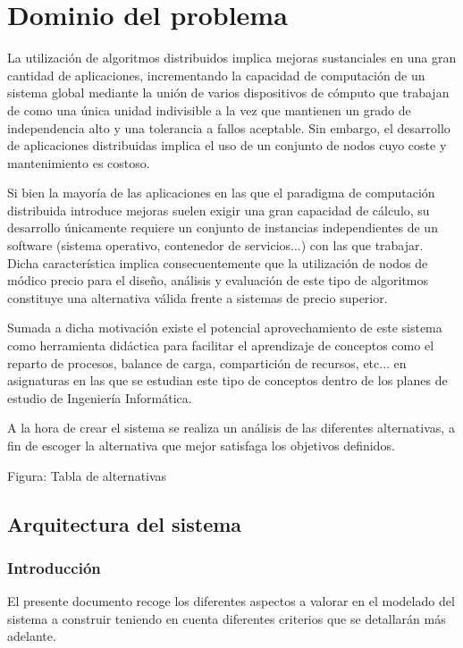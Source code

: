\chapter{Dominio del problema}

La utilización de algoritmos distribuidos implica mejoras sustanciales en una gran cantidad de aplicaciones, incrementando la capacidad de computación de un sistema global mediante la unión de varios dispositivos de cómputo que trabajan de como una única unidad indivisible a la vez que mantienen un grado de independencia alto y una tolerancia a fallos aceptable. Sin embargo, el desarrollo de aplicaciones distribuidas implica el uso de un conjunto de nodos cuyo coste y mantenimiento es costoso.

Si bien la mayoría de las aplicaciones en las que el paradigma de computación distribuida introduce mejoras suelen exigir una gran capacidad de cálculo, su desarrollo únicamente requiere un conjunto de instancias independientes de un software (sistema operativo, contenedor de servicios...) con las que trabajar. Dicha característica implica consecuentemente que la utilización de nodos de módico precio para el diseño, análisis y evaluación de este tipo de algoritmos constituye una alternativa válida frente a sistemas de precio superior.

Sumada a dicha motivación existe el potencial aprovechamiento de este sistema como herramienta didáctica para facilitar el aprendizaje de conceptos como el reparto de procesos, balance de carga, compartición de recursos, etc... en asignaturas en las que se estudian este tipo de conceptos dentro de los planes de estudio de Ingeniería Informática.

A la hora de crear el sistema se realiza un análisis de las diferentes alternativas, a fin de escoger la alternativa que mejor satisfaga los objetivos definidos.

Figura: Tabla de alternativas

\section{Arquitectura del sistema}

\subsection{Introducción}

El presente documento recoge los diferentes aspectos a valorar en el modelado del sistema a construir teniendo en cuenta diferentes criterios que se detallarán más adelante.

